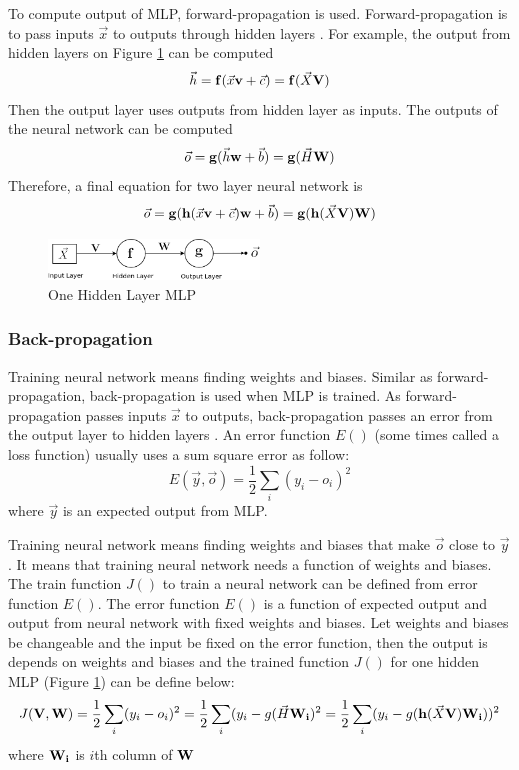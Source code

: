 \documentclass[draft,dvipsnames]{drexel-thesis}
\begin{document}
\begin{thesis}
To compute output of MLP, forward-propagation is used. Forward-propagation is to pass inputs $\vec{x}$ to outputs through hidden layers \cite{murphy2012machine}. For example, the output from hidden layers on Figure \ref{fig:MLP} can be computed
$$\vec{h} = \bold{f}(\vec{x}\bold{v}+\vec{c}) = \bold{f}(\vec{X}\bold{V})$$
Then the output layer uses outputs from hidden layer as inputs. The outputs of the neural network can be computed
$$\vec{o} = \bold{g}(\vec{h}\bold{w}+\vec{b}) = \bold{g}(\vec{H}\bold{W})$$
Therefore, a final equation for two layer neural network is
$$\vec{o} = \bold{g}(\bold{h}(\vec{x}\bold{v}+\vec{c})\bold{w}+\vec{b}) = \bold{g}(\bold{h}(\vec{X}\bold{V})\bold{W})$$

\begin{figure}[t!]
    \centering
    \includegraphics[width=0.5\textwidth]{pictures/figures/MLP.png}
    \caption{One Hidden Layer MLP}
    \label{fig:MLP}
\end{figure}


\subsubsection{Back-propagation}\label{subsubsec:BP}
Training neural network means finding weights and biases. Similar as forward-propagation, back-propagation is used when MLP is trained. As forward-propagation passes inputs $\vec{x}$ to outputs, back-propagation passes an error from the output layer to hidden layers \cite{murphy2012machine}. An error function $E()$ (some times called a loss function) usually uses a sum square error as follow:
$$E(\vec{y}, \vec{o}) = \frac{1}{2}\sum_{i}(y_i-o_i)^2$$
where $\vec{y}$ is an expected output from MLP.

Training neural network means finding weights and biases that make $\vec{o}$ close to $\vec{y}$. It means that training neural network needs a function of weights and biases. The train function $J()$ to train a neural network can be defined from error function $E()$. The error function $E()$ is a function of expected output and output from neural network with fixed weights and biases. Let weights and biases be changeable and the input be fixed on the error function, then the output is depends on weights and biases and the trained function $J()$ for one hidden MLP (Figure \ref{fig:MLP}) can be define below:
$$J(\bold{V}, \bold{W}) = \frac{1}{2}\sum_{i}(y_i-o_i)^2 = \frac{1}{2}\sum_{i}(y_i-g(\vec{H}\bold{W_i})^2 =\frac{1}{2}\sum_{i}(y_i-g(\bold{h}(\vec{X}\bold{V})\bold{W_i}))^2$$
where $\bold{W_i}$ is $i$th column of $\bold{W}$


\end{thesis}
\end{document}
